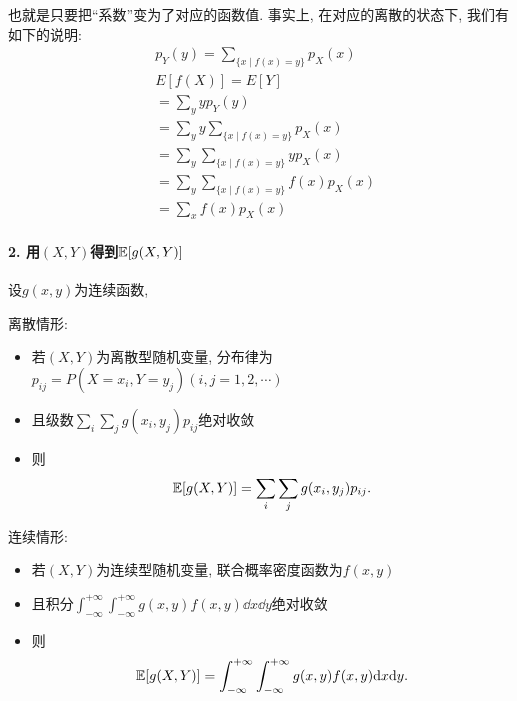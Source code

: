     也就是只要把``系数''变为了对应的函数值. 事实上, 在对应的离散的状态下, 我们有如下的说明: 
    \begin{align*} & p_Y(y)=\sum_{\{x \mid f(x)=y\}} p_X(x) \\ & E[f(X)]=E[Y] \\ & =\sum_y y p_Y(y) \\ & =\sum_y y \sum_{\{x \mid f(x)=y\}} p_X(x) \\ & =\sum_y \sum_{\{x \mid f(x)=y\}} y p_X(x) \\ & =\sum_y \sum_{\{x \mid f(x)=y\}} f(x) p_X(x) \\ & =\sum_x f(x) p_X(x)\end{align*}

    \paragraph{2. 用$(X,Y)$得到$\mathbb E[g(X,Y)]$}设$g(x,y)$为连续函数, 

    离散情形: 
    \begin{itemize}
        \item 若$(X,Y)$为离散型随机变量, 分布律为$p_{ij} = P(X=x_i,Y=y_j)(i,j=1,2,\cdots)$
        \item 且级数$\sum_i \sum_j g(x_i,y_j)p_{ij}$绝对收敛
        \item 则$$\mathbb E[g(X,Y)]=\sum_i \sum_j g(x_i,y_j)p_{ij}.$$
    \end{itemize}    

    连续情形:\begin{itemize}
        \item 若$(X,Y)$为连续型随机变量, 联合概率密度函数为$f(x,y)$
        \item 且积分$\int_{-\infty}^{+\infty}\int_{-\infty}^{+\infty}g(x,y)f(x,y)\dd x\dd y$绝对收敛
        \item 则$$\mathbb E[g(X,Y)]=\int_{-\infty}^{+\infty}\int_{-\infty}^{+\infty}g(x,y)f(x,y)\mathrm{d} x\mathrm{d} y.$$
    \end{itemize}  

